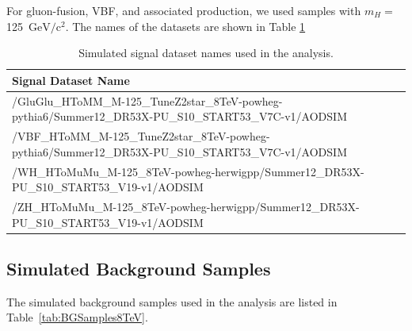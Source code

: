 \documentclass[12pt]{article}
\begin{document}
For gluon-fusion, VBF, and associated production, we used samples with $m_H =$ 125~$\textrm{GeV}/\textrm{c}^{2}$. 
The names of the datasets are shown in Table \ref{tab:sigDatasets}

\begin{table}[htb]
\caption{Simulated signal dataset names used in the analysis.
\label{tab:sigDatasets}
}
\small
\begin{center}
\begin{tabular}{ |p{12cm}|}
\hline
Signal Dataset Name \\
\hline
\hline
/GluGlu\_HToMM\_M-125\_TuneZ2star\_8TeV-powheg-pythia6/Summer12\_DR53X-PU\_S10\_START53\_V7C-v1/AODSIM \\
\hline
/VBF\_HToMM\_M-125\_TuneZ2star\_8TeV-powheg-pythia6/Summer12\_DR53X-PU\_S10\_START53\_V7C-v1/AODSIM \\
\hline
/WH\_HToMuMu\_M-125\_8TeV-powheg-herwigpp/Summer12\_DR53X-PU\_S10\_START53\_V19-v1/AODSIM \\
\hline
/ZH\_HToMuMu\_M-125\_8TeV-powheg-herwigpp/Summer12\_DR53X-PU\_S10\_START53\_V19-v1/AODSIM \\
\hline
\end{tabular}
\end{center}
\end{table}


\subsection{Simulated Background Samples}

The simulated background samples used in the analysis are listed in 
Table~\ref{tab:BGSamples8TeV}.
\end{document}

